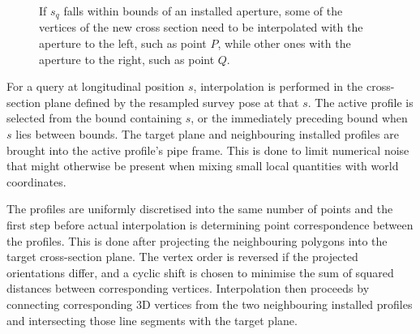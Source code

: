 \begin{figure}
	\centering
	\caption{If $s_q$ falls within bounds of an installed aperture, some of the vertices of the new cross section need to be interpolated with the aperture to the left, such as point $P$, while other ones with the aperture to the right, such as point $Q$.}\label{fig:aperture-interpolation-both-sides}
\end{figure}

For a query at longitudinal position $s$, interpolation is performed in the cross-section
plane defined by the resampled survey pose at that $s$.
The active profile is selected from the bound containing $s$, or the immediately preceding
bound when $s$ lies between bounds.
The target plane and neighbouring installed profiles are brought into the active profile's
pipe frame.
This is done to limit numerical noise that might otherwise be present when mixing small local quantities with world coordinates.

The profiles are uniformly discretised into the same number of points and the first step before actual interpolation is determining point correspondence between the profiles.
This is done after projecting the neighbouring polygons into the target cross-section plane.
The vertex order is reversed if the projected orientations differ, and a cyclic shift is
chosen to minimise the sum of squared distances between corresponding vertices.
Interpolation then proceeds by connecting corresponding 3D vertices from the two neighbouring installed profiles and intersecting those line segments with the target plane.

